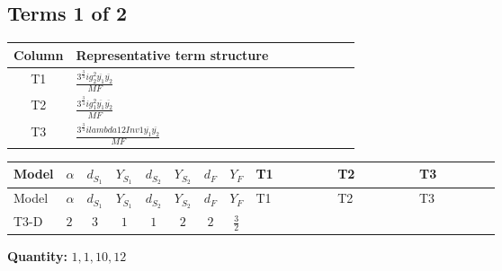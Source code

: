 \documentclass[8pt]{article}
\begin{document}
\begin{landscape}
\subsection*{Terms 1 of 2}
\begin{center}
\begin{tabular}{@{}c >{\raggedright\arraybackslash}p{0.82\linewidth}@{}}
\toprule
Column & Representative term structure \\
\midrule
T1 & \(\displaystyle \frac{3^{\frac{3}{4}} i g_{2}^{2} \overline{y_{1}} \overline{y_{2}}}{MF}\) \\
\midrule
T2 & \(\displaystyle \frac{3^{\frac{3}{4}} i g_{1}^{2} \overline{y_{1}} \overline{y_{2}}}{MF}\) \\
\midrule
T3 & \(\displaystyle \frac{3^{\frac{3}{4}} i lambda12Inv1 \overline{y_{1}} \overline{y_{2}}}{MF}\) \\
\midrule
\bottomrule
\end{tabular}
\end{center}
\smallskip
\tiny
\begin{longtable}{@{}llcccccc >{\raggedright\arraybackslash}p{0.21\linewidth} >{\raggedright\arraybackslash}p{0.21\linewidth} >{\raggedright\arraybackslash}p{0.21\linewidth}@{}}
\toprule
Model & $\alpha$ & $d_{S_1}$ & $Y_{S_1}$ & $d_{S_2}$ & $Y_{S_2}$ & $d_F$ & $Y_F$ & T1 & T2 & T3 \\
\midrule
\endfirsthead
\toprule
Model & $\alpha$ & $d_{S_1}$ & $Y_{S_1}$ & $d_{S_2}$ & $Y_{S_2}$ & $d_F$ & $Y_F$ & T1 & T2 & T3 \\
\midrule
\endhead
T3-D & $2$ & $3$ & $1$ & $1$ & $2$ & $2$ & $\frac{3}{2}$ & \scriptsize\adjustbox{max width=\linewidth}{$\begin{gathered} - \frac{11 \cdot 3^{\frac{3}{4}} i g_{2}^{2} \overline{y_{1}} \overline{y_{2}}}{8 MF}\end{gathered}$} & \scriptsize\adjustbox{max width=\linewidth}{$\begin{gathered} - \frac{9 \cdot 3^{\frac{3}{4}} i g_{1}^{2} \overline{y_{1}} \overline{y_{2}}}{8 MF}\end{gathered}$} & \scriptsize\adjustbox{max width=\linewidth}{$\begin{gathered} - \frac{3^{\frac{3}{4}} i lambda12Inv1 \overline{y_{1}} \overline{y_{2}}}{6 MF}\end{gathered}$} \\
\midrule
\bottomrule
\end{longtable}
\clearpage
\noindent\textbf{Quantity: }$\mathrm{1,1,10,12}$\par\smallskip

\end{landscape}
\end{document}
